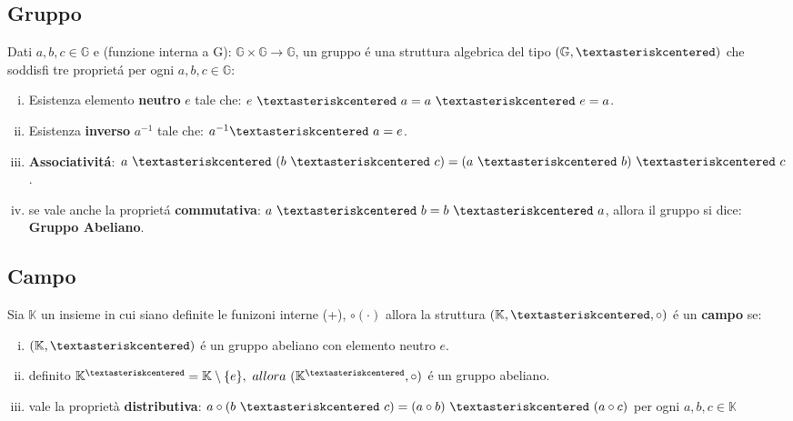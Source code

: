 \documentclass{article}
\begin{document}
\subsection{Gruppo}
Dati $a, b, c \in \mathbb{G}$ e \textasteriskcentered(funzione interna a G):
$\mathbb{G} \times \mathbb{G} \to \mathbb{G}$, un gruppo é una struttura
algebrica del tipo $(\mathbb{G} , \textasteriskcentered)$ che soddisfi tre
proprietá per ogni $a, b ,c \in \mathbb{G}$:
\begin{enumerate}[i.]
	\item Esistenza elemento \textbf{neutro} \underline{$e$} tale che: $e \
		      \textasteriskcentered \ a = a \ \textasteriskcentered \ e = a$.
	\item Esistenza \textbf{inverso} \underline{$a^{-1}$} tale che: $a^{-1}
		      \textasteriskcentered \ a = e$.
	\item \textbf{Associativitá}: $a \ \textasteriskcentered \ (b \ \textasteriskcentered \ c) =
		      (a \ \textasteriskcentered \ b) \ \textasteriskcentered \ c$.
	\item se vale anche la proprietá \textbf{commutativa}: $a \ \textasteriskcentered \ b
		      = b \ \textasteriskcentered \ a$, allora il gruppo si dice: \textbf{Gruppo
		      Abeliano}.
\end{enumerate}
\subsection{Campo}
Sia $\mathbb{K}$ un insieme in cui siano definite le funizoni interne
\textasteriskcentered(+), $\circ(\cdot)$ allora la struttura $(\mathbb{K},
	\textasteriskcentered, \circ)$ é un \textbf{campo} se:
\begin{enumerate}[i.]
	\item $(\mathbb{K}, \textasteriskcentered)$ é un gruppo abeliano con elemento neutro $e$.
	\item definito $\mathbb{K}^{\textasteriskcentered} = \mathbb{K} \setminus \{e\}, \
		      allora \ (\mathbb{K}^{\textasteriskcentered}, \circ)$ é un gruppo abeliano.
	\item vale la proprietà \textbf{distributiva}: $a \circ (b \ \textasteriskcentered \
		      c) = (a \circ b)\ \textasteriskcentered \ (a \circ c) \ $per ogni $a, b, c \in
		      \mathbb{K}$
\end{enumerate}
\end{document}
